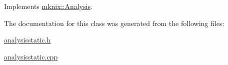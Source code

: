 Implements \hyperlink{classmknix_1_1_analysis_a6dd7026a22ae11f3eef3dad3be370e70}{mknix\-::\-Analysis}.



The documentation for this class was generated from the following files\-:\begin{DoxyCompactItemize}
\item 
\hyperlink{analysisstatic_8h}{analysisstatic.\-h}\item 
\hyperlink{analysisstatic_8cpp}{analysisstatic.\-cpp}\end{DoxyCompactItemize}
